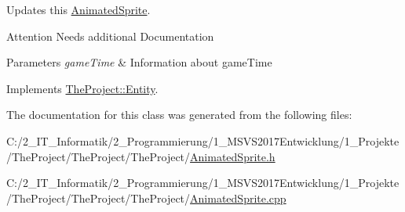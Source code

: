 Updates this \mbox{\hyperlink{class_the_project_1_1_animated_sprite}{Animated\+Sprite}}. 

\begin{DoxyAttention}{Attention}
Needs additional Documentation 
\end{DoxyAttention}

\begin{DoxyParams}{Parameters}
{\em game\+Time} & Information about game\+Time \\
\hline
\end{DoxyParams}


Implements \mbox{\hyperlink{class_the_project_1_1_entity_a8ec5c42d4c918f5c98a482fb28b72da2}{The\+Project\+::\+Entity}}.



The documentation for this class was generated from the following files\+:\begin{DoxyCompactItemize}
\item 
C\+:/2\+\_\+\+I\+T\+\_\+\+Informatik/2\+\_\+\+Programmierung/1\+\_\+\+M\+S\+V\+S2017\+Entwicklung/1\+\_\+\+Projekte/\+The\+Project/\+The\+Project/\+The\+Project/\mbox{\hyperlink{_animated_sprite_8h}{Animated\+Sprite.\+h}}\item 
C\+:/2\+\_\+\+I\+T\+\_\+\+Informatik/2\+\_\+\+Programmierung/1\+\_\+\+M\+S\+V\+S2017\+Entwicklung/1\+\_\+\+Projekte/\+The\+Project/\+The\+Project/\+The\+Project/\mbox{\hyperlink{_animated_sprite_8cpp}{Animated\+Sprite.\+cpp}}\end{DoxyCompactItemize}
